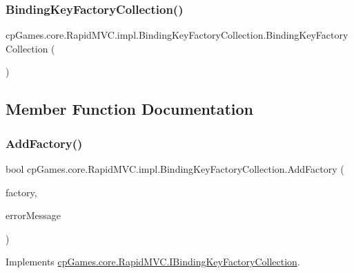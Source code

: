 \subsubsection{\texorpdfstring{BindingKeyFactoryCollection()}{BindingKeyFactoryCollection()}}
{\footnotesize\ttfamily cp\+Games.\+core.\+Rapid\+M\+V\+C.\+impl.\+Binding\+Key\+Factory\+Collection.\+Binding\+Key\+Factory\+Collection (\begin{DoxyParamCaption}{ }\end{DoxyParamCaption})}



\subsection{Member Function Documentation}
\mbox{\label{classcp_games_1_1core_1_1_rapid_m_v_c_1_1impl_1_1_binding_key_factory_collection_a401eb3e5efc28299218f217695a40718}} 
\subsubsection{\texorpdfstring{AddFactory()}{AddFactory()}}
{\footnotesize\ttfamily bool cp\+Games.\+core.\+Rapid\+M\+V\+C.\+impl.\+Binding\+Key\+Factory\+Collection.\+Add\+Factory (\begin{DoxyParamCaption}\item[{\mbox{\hyperlink{interfacecp_games_1_1core_1_1_rapid_m_v_c_1_1_i_binding_key_factory}{I\+Binding\+Key\+Factory}}}]{factory,  }\item[{out string}]{error\+Message }\end{DoxyParamCaption})}



Implements \mbox{\hyperlink{interfacecp_games_1_1core_1_1_rapid_m_v_c_1_1_i_binding_key_factory_collection_aa7aace3ebec361b82a563258ddda2213}{cp\+Games.\+core.\+Rapid\+M\+V\+C.\+I\+Binding\+Key\+Factory\+Collection}}.

\mbox{\label{classcp_games_1_1core_1_1_rapid_m_v_c_1_1impl_1_1_binding_key_factory_collection_a63ede48e3fa4b488ca0537e37fe3e086}} 
